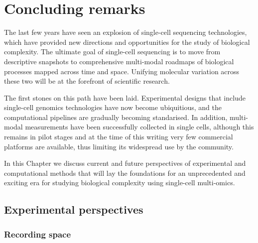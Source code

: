 \graphicspath{{Chapter5/Figs/}}

\chapter{Concluding remarks}

The last few years have seen an explosion of single-cell sequencing technologies, which have provided new directions and opportunities for the study of biological complexity. The ultimate goal of single-cell sequencing is to move from descriptive snapshots to comprehensive multi-modal roadmaps of biological processes mapped across time and space. Unifying molecular variation across these two will be at the forefront of scientific research.
 
The first stones on this path have been laid. Experimental designs that include single-cell genomics technologies have now become ubiquitious, and the computational pipelines are gradually becoming standarised. In addition, multi-modal measurements have been successfully collected in single cells, although this remains in pilot stages and at the time of this writing very few commercial platforms are available, thus limiting its widespread use by the community. 

In this Chapter we discuss current and future perspectives of experimental and computational methods that will lay the foundations for an unprecedented and exciting era for studying biological complexity using single-cell multi-omics.


\section{Experimental perspectives} 

\subsection{Recording space} 

